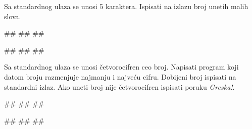 \begin{Exercise}[label=p1.2_] 
 Sa standardnog ulaza se unosi 5 karaktera. Ispisati na izlazu broj unetih malih slova.\\
\begin{miditest}
\begin{upotreba}{1}
#\naslovInt#
##
##
\end{upotreba}
\end{miditest}
\begin{miditest}
\begin{upotreba}{2}
#\naslovInt#
##
##
\end{upotreba}
\end{miditest}

\end{Exercise}
\begin{Answer}[ref=p1.2_]
\end{Answer}

\begin{Exercise}[label=p1.2_] 
 Sa standardnog ulaza se unosi četvorocifren ceo broj. Napisati program koji datom broju razmenjuje najmanju i najveću cifru. Dobijeni broj ispisati na standardni izlaz. Ako uneti broj nije četvorocifren ispisati poruku \textit{Greska!}. \\
\begin{miditest}
\begin{upotreba}{1}
#\naslovInt#
##
##
\end{upotreba}
\end{miditest}
\begin{miditest}
\begin{upotreba}{2}
#\naslovInt#
##
##
\end{upotreba}
\end{miditest}

\end{Exercise}
\begin{Answer}[ref=p1.2_]
\end{Answer}

